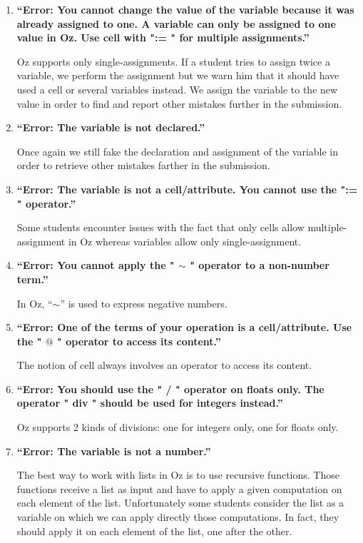 \documentclass[11pt,a4paper,twoside,openright]{report}
\begin{document}
\begin{enumerate}

\item \textbf{\enquote{Error: You cannot change the value of the variable because 
it was already assigned to one. A variable can only be assigned to one value in 
Oz. Use cell with ":= " for multiple assignments.}} 

Oz supports only single-assignments. If a student tries to assign twice a 
variable, we perform the assignment but we warn him that it should have used a 
cell or several variables instead. We assign the variable to the new value in 
order to find and report other mistakes further in the submission.


\item \textbf{\enquote{Error: The variable is not declared.}}

Once again we still fake the declaration and assignment of the variable in 
order to retrieve other mistakes farther in the submission.

\item \textbf{\enquote{Error: The variable is not a cell/attribute. You cannot use 
the ":= " operator.}}

Some students encounter issues with the fact that only cells allow 
multiple-assignment in Oz whereas variables allow only single-assignment.

\item \textbf{\enquote{Error: You cannot apply the " $\sim$ " operator to 
a non-number term.}}

In Oz, \enquote{$\sim$} is used to express negative numbers.

\item \textbf{\enquote{Error: One of the terms of your operation is a cell/attribute. 
Use the " $@$ " operator to access its content.}}

The notion of cell always involves an operator to access its content.

\item \textbf{\enquote{Error: You should use the " / " operator on floats only. The 
operator " div " should be used for integers instead.}}

Oz supports 2 kinds of divisions: one for integers only, one for floats only.

\item \textbf{\enquote{Error: The variable is not a number.}} 

The best way to work with lists in Oz is to use recursive functions. Those 
functions receive a list as input and have to apply a given computation on each 
element of the list. Unfortunately some students consider the list as a 
variable on which we can apply directly those computations. In fact, they 
should apply it on each element of the list, one after the other.


\end{enumerate}
\end{document}

